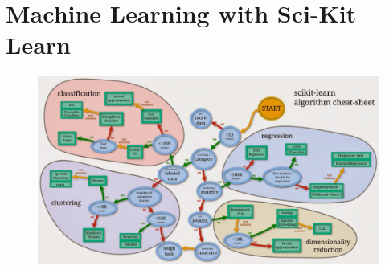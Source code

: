 \documentclass{article}
\begin{document}
    \begin{center}
    \end{center}
    { \hspace*{\fill} \\}
    
    \section{Machine Learning with Sci-Kit Learn}

\begin{figure}[htbp]
\centering
\includegraphics{scikit.jpg}
\end{figure}
\end{document}
